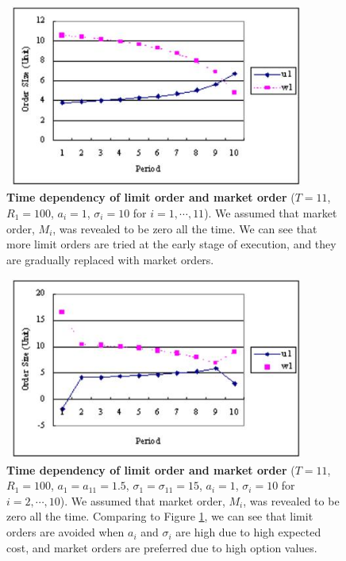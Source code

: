 \begin{figure}[htbp]
\begin{center}
 \includegraphics[width=10cm,height=6cm]{fg_l3n.png}
\end{center}
\caption[Time dependency of limit order and market order]
{{\bf Time dependency of limit order and market order} ($T=11$,
 $R_1=100$, $a_i=1$, $\sigma_i=10$ for $i=1, \cdots, 11$).
 \quad We assumed that market order, $M_i$, was revealed to be zero all the time.
 We can see that more limit orders are tried at the early stage of execution, and they are gradually replaced
with market orders.}\label{fg_l3}
\end{figure}

\begin{figure}[htbp]
\begin{center}
 \includegraphics[width=10cm,height=6cm]{fg_l4n.png}
\end{center}
\caption[Time dependency of limit order and market order]
{{\bf Time dependency of limit order and market order} ($T=11$, $R_1=100$, $a_1=a_{11}=1.5$,
$\sigma_1=\sigma_{11}=15$, $a_i=1$, $\sigma_i=10$ for $i=2, \cdots, 10$).
 \quad We assumed that market order, $M_i$, was revealed to be zero all the time.
 Comparing to Figure \ref{fg_l3}, we can see that limit orders are avoided when $a_i$ and $\sigma_i$ are high
due to high expected cost, and market orders are preferred due to high option values.}\label{fg_l4}
\end{figure}


